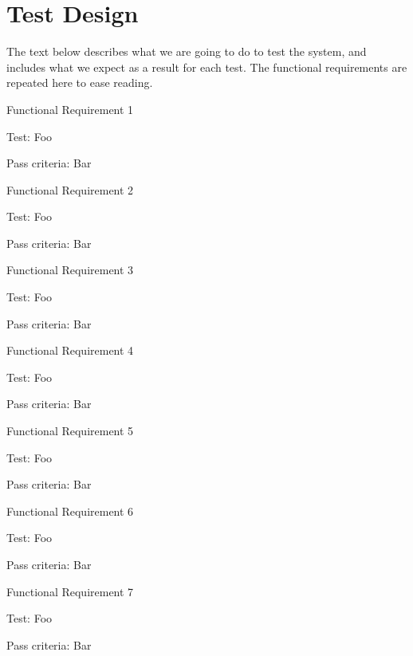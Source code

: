 \section{Test Design}

The text below describes what we are going to do to test the system, and
includes what we expect as a result for each test. The functional requirements
are repeated here to ease reading.

{\sc Functional Requirement 1}
\begin{addmargin}[2cm]{0cm}
  {\em \FRI}

  {\sc Test:} Foo

  {\sc Pass criteria:} Bar
\end{addmargin}

{\sc Functional Requirement 2}
\begin{addmargin}[2cm]{0cm}
  {\em \FRII}
  
  {\sc Test:} Foo

  {\sc Pass criteria:} Bar
\end{addmargin}

{\sc Functional Requirement 3}
\begin{addmargin}[2cm]{0cm}
  {\em \FRIII}
  
  {\sc Test:} Foo

  {\sc Pass criteria:} Bar
\end{addmargin}

{\sc Functional Requirement 4}
\begin{addmargin}[2cm]{0cm}
  {\em \FRIV}
  
  {\sc Test:} Foo

  {\sc Pass criteria:} Bar
\end{addmargin}

{\sc Functional Requirement 5}
\begin{addmargin}[2cm]{0cm}
  {\em \FRV}
  
  {\sc Test:} Foo

  {\sc Pass criteria:} Bar
\end{addmargin}

{\sc Functional Requirement 6}
\begin{addmargin}[2cm]{0cm}
  {\em \FRVI}
  
  {\sc Test:} Foo

  {\sc Pass criteria:} Bar
\end{addmargin}

{\sc Functional Requirement 7}
\begin{addmargin}[2cm]{0cm}
  {\em \FRVII}
  
  {\sc Test:} Foo

  {\sc Pass criteria:} Bar
\end{addmargin}

